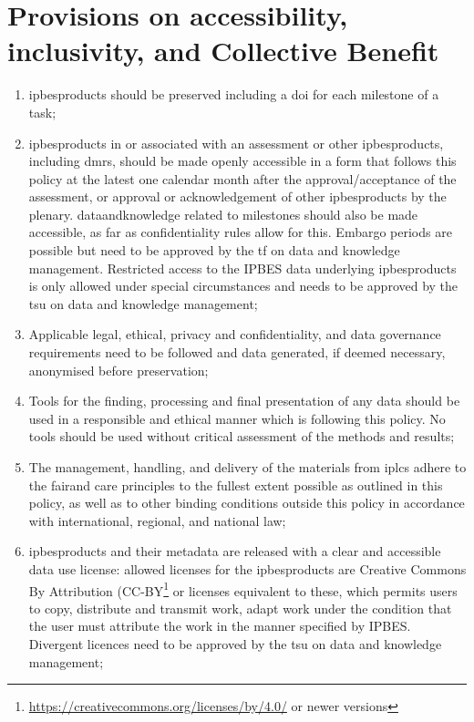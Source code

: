 \documentclass{article}
\begin{document}
\section{Provisions on accessibility, inclusivity, and Collective Benefit}

\begin{enumerate}[label=(\alph*)]
    \item \glspl{ipbesproduct} should be preserved including a \gls{doi} for each \gls{milestone} of a \gls{task};

    \item \glspl{ipbesproduct} in or associated with an assessment or other \glspl{ipbesproduct}, including \glspl{dmr}, should be made openly \gls{accessible} in a form that follows this policy at the latest one calendar month after the approval/acceptance of the assessment, or approval or acknowledgement of other \glspl{ipbesproduct} by the \gls{plenary}. \gls{dataandknowledge} related to \glspl{milestone} should also be made \gls{accessible}, as far as confidentiality rules allow for this. Embargo periods are possible but need to be approved by the \gls{tf} on data and knowledge management. Restricted access to the IPBES \gls{data} underlying \glspl{ipbesproduct} is only allowed under special circumstances and needs to be approved by the  \gls{tsu} on \gls{data} and \gls{knowledge} management;

    \item Applicable legal, ethical, privacy and confidentiality, and \gls{data} governance requirements need to be followed and \gls{data} generated, if deemed necessary, anonymised before preservation;

    \item Tools for the finding, processing and final presentation of any \gls{data} should be used in a responsible and ethical manner which is following this policy. No tools should be used without critical assessment of the methods and results;

    \item The management, handling, and delivery of the materials from \glspl{iplc} adhere to the \gls{fair}and \gls{care} principles to the fullest extent possible as outlined in this policy, as well as to other binding conditions outside this policy in accordance with international, regional, and national law;

    \item \glspl{ipbesproduct} and their metadata are released with a clear and \gls{accessible} \gls{data} use license: allowed licenses for the \glspl{ipbesproduct} are Creative Commons By Attribution (CC-BY\footnote{\href{https://creativecommons.org/licenses/by/4.0/}{https://creativecommons.org/licenses/by/4.0/} or newer versions} or licenses equivalent to these, which permits users to copy, distribute and transmit work, adapt work under the condition that the user must attribute the work in the manner specified by IPBES. Divergent licences need to be approved by the  \gls{tsu} on \gls{data} and \gls{knowledge} management;


\end{enumerate}
\end{document}
